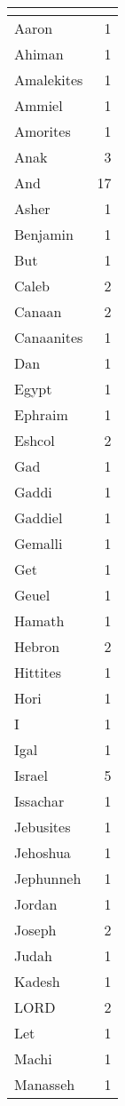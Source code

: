 \begin{center}
\begin{longtable}{l|r}
\hline \multicolumn{2}{c}{{ }} \\ \hline
\endfoot 
Aaron & 1\\ \hline 
Ahiman & 1\\ \hline 
Amalekites & 1\\ \hline 
Ammiel & 1\\ \hline 
Amorites & 1\\ \hline 
Anak & 3\\ \hline 
And & 17\\ \hline 
Asher & 1\\ \hline 
Benjamin & 1\\ \hline 
But & 1\\ \hline 
Caleb & 2\\ \hline 
Canaan & 2\\ \hline 
Canaanites & 1\\ \hline 
Dan & 1\\ \hline 
Egypt & 1\\ \hline 
Ephraim & 1\\ \hline 
Eshcol & 2\\ \hline 
Gad & 1\\ \hline 
Gaddi & 1\\ \hline 
Gaddiel & 1\\ \hline 
Gemalli & 1\\ \hline 
Get & 1\\ \hline 
Geuel & 1\\ \hline 
Hamath & 1\\ \hline 
Hebron & 2\\ \hline 
Hittites & 1\\ \hline 
Hori & 1\\ \hline 
I & 1\\ \hline 
Igal & 1\\ \hline 
Israel & 5\\ \hline 
Issachar & 1\\ \hline 
Jebusites & 1\\ \hline 
Jehoshua & 1\\ \hline 
Jephunneh & 1\\ \hline 
Jordan & 1\\ \hline 
Joseph & 2\\ \hline 
Judah & 1\\ \hline 
Kadesh & 1\\ \hline 
LORD & 2\\ \hline 
Let & 1\\ \hline 
Machi & 1\\ \hline 
Manasseh & 1\\ \hline 

\end{longtable}
\end{center}
